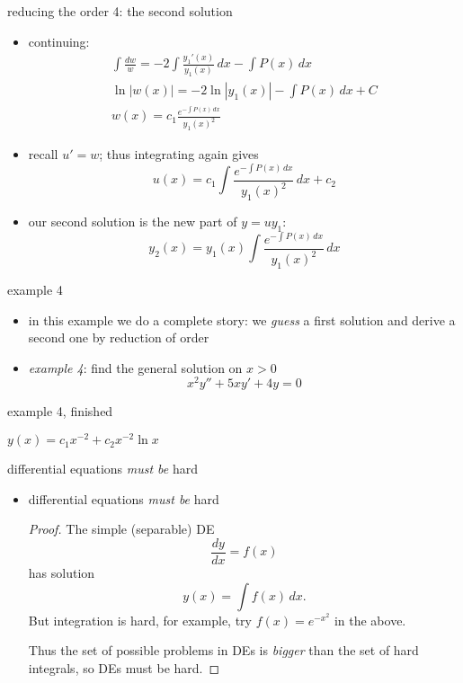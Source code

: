 \documentclass[dvipsnames]{beamer}
\begin{document}
\begin{frame}{reducing the order 4: the second solution}

\begin{itemize}
\item continuing:
\begin{gather*}
\int \frac{dw}{w} = - 2 \int \frac{y_1'(x)}{y_1(x)}\,dx - \int P(x)\,dx \\
\ln|w(x)| = - 2 \ln|y_1(x)| - \int P(x)\,dx + C \\
w(x) = c_1 \frac{e^{-\int P(x)\,dx}}{y_1(x)^2}
\end{gather*}
\item recall $u'=w$; thus integrating again gives
    $$u(x) = c_1 \int \frac{e^{-\int P(x)\,dx}}{y_1(x)^2}\,dx + c_2$$
\item our second solution is the new part of $y=uy_1$:
    $$y_2(x) = y_1(x) \int \frac{e^{-\int P(x)\,dx}}{y_1(x)^2}\,dx$$
\end{itemize}
\end{frame}


\begin{frame}{example 4}

\begin{itemize}
\item in this example we do a complete story: we \emph{guess} a first solution and derive a second one by reduction of order
\item \emph{example 4}: find the general solution on $x>0$
    $$x^2 y'' + 5 x y' + 4 y = 0$$
\end{itemize}

\vspace{60mm}
\end{frame}


\begin{frame}{example 4, finished}

\vspace{60mm}

\hfill $y(x) = c_1 x^{-2} + c_2 x^{-2} \ln x$
\end{frame}


\begin{frame}{differential equations \emph{must be} hard}

\begin{itemize}
\item differential equations \emph{must be} hard

\bigskip
\begin{proof} The simple (separable) DE
    $$\frac{dy}{dx} = f(x)$$
has solution
    $$y(x) = \int f(x)\,dx.$$
But integration is hard, for example, try $f(x)=e^{-x^2}$ in the above.

Thus the set of possible problems in DEs is \emph{bigger} than the set of hard integrals, so DEs must be hard.
\end{proof}
\end{itemize}
\end{frame}
\end{document}
